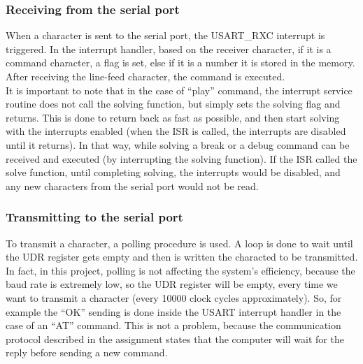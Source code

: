 \documentclass[12pt, a4, hidelinks]{article}
\begin{document}
\subsubsection*{Receiving from the serial port}
When a character is sent to the serial port, the USART\_RXC interrupt is triggered. In the interrupt handler, based on the receiver character, if it is a command character, a flag is set, else if it is a number it is stored in the memory. After receiving the line-feed character, the command is executed. \\
It is important to note that in the case of ``play'' command, the interrupt service routine does not call the solving function, but simply sets the solving flag and returns. This is done to return back as fast as possible, and then start solving with the interrupts enabled (when the ISR is called, the interrupts are disabled until it returns). In that way, while solving a break or a debug command can be received and executed (by interrupting the solving function). If the ISR called the solve function, until completing solving, the interrupts would be disabled, and any new characters from the serial port would not be read.

\subsubsection*{Transmitting to the serial port}
To transmit a character, a polling procedure is used. A loop is done to wait until the UDR register gets empty and then is written the characted to be transmitted. In fact, in this project, polling is not affecting the system's efficiency, because the baud rate is extremely low, so the UDR register will be empty, every time we want to transmit a character (every 10000 clock cycles approximately). So, for example the ``OK'' sending is done inside the USART interrupt handler in the case of an ``AT'' command. This is not a problem, because the communication protocol described in the assignment states that the computer will wait for the reply before sending a new command.
\end{document}
